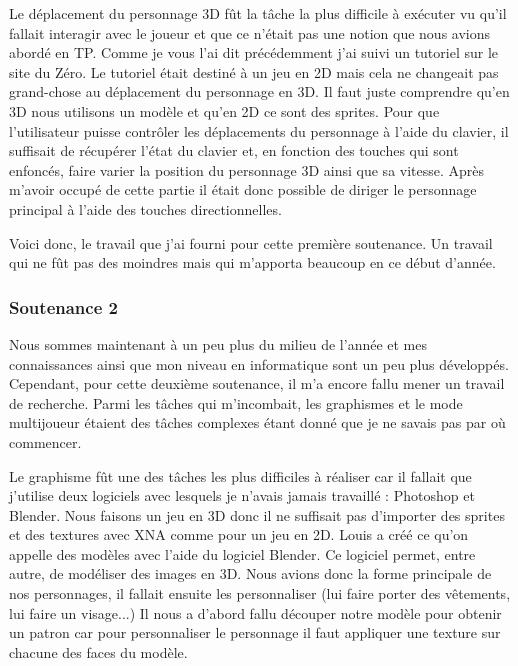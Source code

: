 \documentclass[12pt]{article}
\begin{document}
Le déplacement du personnage 3D fût la tâche la plus difficile à exécuter vu qu'il fallait interagir avec le joueur et que ce n'était pas une notion que nous avions abordé en TP. Comme je vous l'ai dit précédemment j'ai suivi un tutoriel sur le site du Zéro. Le tutoriel était destiné à un jeu en 2D mais cela ne changeait pas grand-chose au déplacement du personnage en 3D. Il faut juste comprendre qu'en 3D nous utilisons un modèle et qu'en 2D ce sont des sprites. Pour que l'utilisateur puisse contrôler les déplacements du personnage à l'aide du clavier, il suffisait de récupérer l'état du clavier et, en fonction des touches qui sont enfoncés, faire varier la position du personnage 3D ainsi que sa vitesse. Après m'avoir occupé de cette partie il était donc possible de diriger le personnage principal à l'aide des touches directionnelles.

Voici donc, le travail que j'ai fourni pour cette première soutenance. Un travail qui ne fût pas des moindres mais qui m'apporta beaucoup en ce début d'année.

\subsubsection{Soutenance 2}
\par
Nous sommes maintenant à un peu plus du milieu de l'année et mes connaissances ainsi que mon niveau en informatique sont un peu plus développés. Cependant, pour cette deuxième soutenance, il m'a encore fallu mener un travail de recherche. Parmi les tâches qui m'incombait, les graphismes et le mode multijoueur étaient des tâches complexes étant donné que je ne savais pas par où commencer.  

\par
Le graphisme fût une des tâches les plus difficiles à réaliser car il fallait que j'utilise deux logiciels avec lesquels je n'avais jamais travaillé : Photoshop et Blender. Nous faisons un jeu en 3D donc il ne suffisait pas d'importer des sprites et des textures avec XNA comme pour un jeu en 2D. Louis a créé ce qu'on appelle des modèles avec l'aide du logiciel Blender. Ce logiciel permet, entre autre, de modéliser des images en 3D. Nous avions donc la forme principale de nos personnages, il fallait ensuite les personnaliser (lui faire porter des vêtements, lui faire un visage...) Il nous a d'abord fallu découper notre modèle pour obtenir un patron car pour personnaliser le personnage il faut appliquer une texture sur chacune des faces du modèle.
\newline
\end{document}
